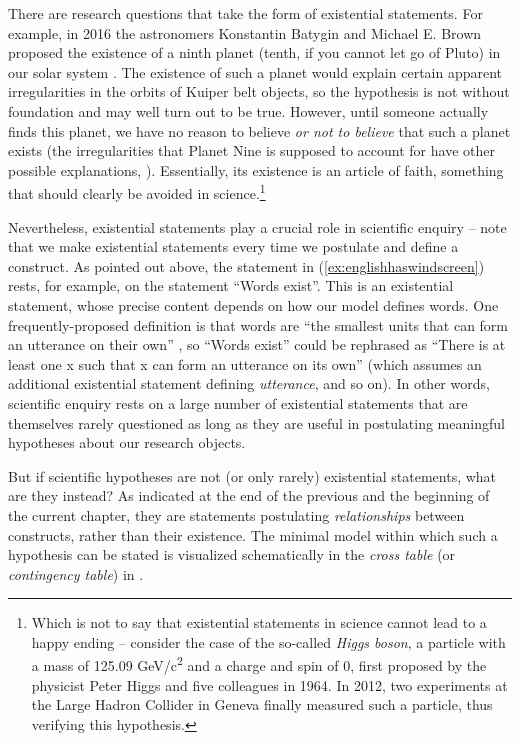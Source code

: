 There are research questions that take the form of existential statements. For example, in 2016 the astronomers Konstantin Batygin and Michael E. Brown proposed the existence of a ninth planet (tenth, if you cannot let go of Pluto) in our solar system \citep{batygin_evidence_2016}. The existence of such a planet would explain  certain apparent irregularities in the orbits of Kuiper belt objects, so the hypothesis  is not without foundation and may well turn out to be true. However, until someone actually finds this planet, we have no reason to believe \textit{or not to believe} that such a planet exists (the irregularities that Planet Nine is supposed to account for have other possible explanations,  \citealt[cf., e.g.][]{shankman_ossos._2017}). Essentially, its existence is an article of faith, something that should clearly be avoided in science.\footnote{Which is not to say that existential statements in science cannot lead to a happy ending -- consider the case of the so\hyp{}called \textit{Higgs boson}, a particle with a mass of 125.09 GeV/c\textsuperscript{2} and a charge and spin of 0, first proposed by the physicist Peter Higgs and five colleagues in 1964. In 2012, two experiments  at the Large Hadron Collider in Geneva finally measured such a particle, thus verifying this  hypothesis.}

Nevertheless, existential statements play a crucial role in scientific enquiry -- note that we make existential statements every time we postulate and define a construct. As pointed out above, the statement in (\ref{ex:englishhaswindscreen}) rests, for example, on the statement ``Words exist''. This is an existential statement, whose precise content depends on how our model defines words. One frequently\hyp{}proposed definition is that words are ``the smallest units that can form an utterance on their own'' \citep[436]{matthews_concise_2014}, so ``Words exist'' could be rephrased as ``There is at least one x such that x can form an utterance on its own'' (which assumes an additional existential statement defining \emph{utterance}, and so on). In other words, scientific enquiry rests on a large number of existential statements that are themselves rarely questioned as long as they are useful in postulating meaningful hypotheses  about our research objects.

But if scientific hypotheses  are not (or only rarely) existential statements, what are they instead? As indicated at the end of the previous and the beginning of the current chapter, they are statements postulating \emph{relationships} between constructs, rather than their existence. The minimal model within which such a hypothesis can be stated is visualized schematically in the \emph{cross table} (or \emph{contingency table})  in .

